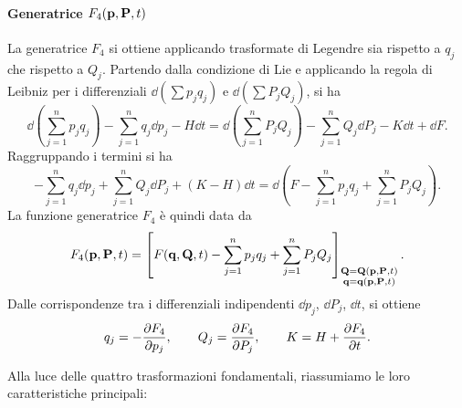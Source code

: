 \paragraph{Generatrice $F_4(\vb{p}, \vb{P}, t)$}
La generatrice $F_4$ si ottiene applicando trasformate di Legendre sia rispetto a $q_j$ che rispetto a $Q_j$. Partendo dalla condizione di Lie e applicando la regola di Leibniz per i differenziali $\dd(\sum p_j q_j)$ e $\dd(\sum P_j Q_j)$, si ha
\begin{equation*}
    \dd{\left(\sum_{j=1}^n p_j q_j\right)} - \sum_{j=1}^n q_j \dd{p_j} - H\dd{t} = \dd{\left(\sum_{j=1}^n P_j Q_j\right)} - \sum_{j=1}^n Q_j \dd{P_j} - K \dd{t} + \dd{F}.
\end{equation*}
Raggruppando i termini si ha
\begin{equation*}
    - \sum_{j=1}^n q_j \dd{p_j} + \sum_{j=1}^n Q_j \dd{P_j} + (K - H)\dd{t} = \dd\left(F - \sum_{j=1}^n p_j q_j + \sum_{j=1}^n P_j Q_j\right).
\end{equation*}
La funzione generatrice $F_4$ è quindi data da
\begin{equation*}
    F_4(\vb{p}, \vb{P}, t) = \left[ F(\vb{q}, \vb{Q}, t) - \sum_{j=1}^n p_j q_j + \sum_{j=1}^n P_j Q_j \right]_{\substack{\vb{Q} = \vb{Q}(\vb{p}, \vb{P}, t) \\ \vb{q} = \vb{q}(\vb{p}, \vb{P}, t)}}.
\end{equation*}
Dalle corrispondenze tra i differenziali indipendenti $\dd{p_j}$, $\dd{P_j}$, $\dd{t}$, si ottiene
\begin{equation*}
    q_j = -\pdv{F_4}{p_j}, \qquad
    Q_j = \pdv{F_4}{P_j}, \qquad
    K = H + \pdv{F_4}{t}.
\end{equation*}

\newpage

Alla luce delle quattro trasformazioni fondamentali, riassumiamo le loro caratteristiche principali:

